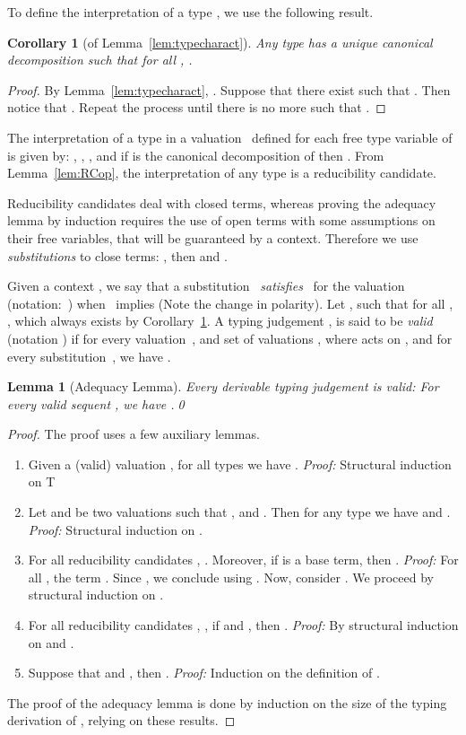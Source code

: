 \documentclass[colorlinks=true,linkcolor=black,urlcolor=black,citecolor=blue,submission,copyright,creativecommons]{eptcs}
\newtheorem{lemma}[theorem]{Lemma}
\newtheorem{corollary}[theorem]{Corollary}
\begin{document}
To define the interpretation of a type , we use the following
result.

\begin{corollary}[of Lemma~\ref{lem:typecharact}]\label{cor:typedecomp}
  Any type  has a unique canonical decomposition
   such that for all , .
\end{corollary}
\begin{proof}
   By Lemma~\ref{lem:typecharact}, . Suppose that there exist
   such that . Then notice that .
  Repeat the process until there is no more 
  such that .
\end{proof}

The interpretation  of a type  in a
valuation~ defined for each free type variable
of~ is given by: , , ,
and if  is the canonical decomposition
of  then 
.
From Lemma~\ref{lem:RCop}, the interpretation of any type is a reducibility candidate.

Reducibility candidates deal with closed terms, whereas proving the adequacy lemma by induction requires the use of open terms with some assumptions on their free variables, that will be guaranteed by a context. Therefore we use \emph{substitutions}  to close terms: , then  and .

  Given a context , we say that a substitution~
  \emph{satisfies}~ for the valuation~
  (notation:~) when~
  implies  (Note the change in
  polarity).  Let , such that for all
  , , which always exists by
  Corollary~\ref{cor:typedecomp}.
A typing judgement , is said to be \emph{valid} (notation ) if for every valuation~, and set of valuations , where  acts on , and for every substitution~, we have .
\medskip

\begin{lemma}[Adequacy Lemma]\label{lem:SNadeq}
Every derivable typing judgement is valid: For every valid sequent , we have .\qed
\end{lemma}
\begin{proof}
 The proof uses a few auxiliary lemmas.
 \begin{enumerate}
  \item\label{lem:polar1}   Given a (valid) valuation , for all types  we have . 
  {\em Proof:} Structural induction on T
\item\label{lem:polar2} Let  and  be two valuations such that ,  and . Then for any type  we have  and .
  {\em Proof:} Structural induction on .
\item\label{lem:1cdotrc}
  For all reducibility candidates , . Moreover, if  is a base term, then
  . 
  {\em Proof:} For all , the term . Since
  , we conclude using .
  Now, consider . We proceed by structural induction on .
\item\label{lem:sumrc}
  For all reducibility candidates ,
  , if  and , then . 
  {\em Proof:} By structural induction on  and
  .
\item\label{lem:applirc}
  Suppose that  and , then
  . 
  {\em Proof:} Induction on the definition of .
 \end{enumerate}
 
 \noindent The proof of the adequacy lemma is done by induction on the size of
the typing derivation of , relying on these
results.
\end{proof}
\end{document}
